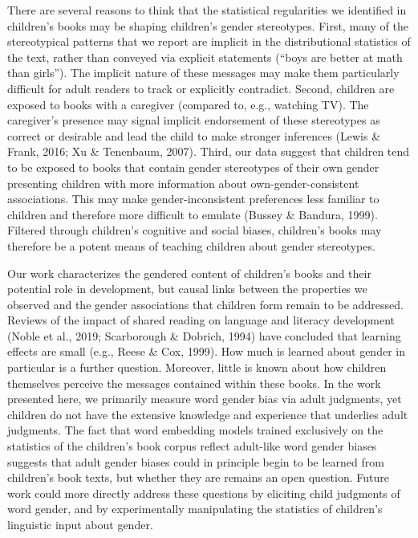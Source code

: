 \documentclass[
  english,
  ,man,floatsintext]{apa6}
\begin{document}
There are several reasons to think that the statistical regularities we identified in children's books may be shaping children's gender stereotypes. First, many of the stereotypical patterns that we report are implicit in the distributional statistics of the text, rather than conveyed via explicit statements (\enquote{boys are better at math than girls}). The implicit nature of these messages may make them particularly difficult for adult readers to track or explicitly contradict. Second, children are exposed to books with a caregiver (compared to, e.g., watching TV). The caregiver's presence may signal implicit endorsement of these stereotypes as correct or desirable and lead the child to make stronger inferences (Lewis \& Frank, 2016; Xu \& Tenenbaum, 2007). Third, our data suggest that children tend to be exposed to books that contain gender stereotypes of their own gender presenting children with more information about own-gender-consistent associations. This may make gender-inconsistent preferences less familiar to children and therefore more difficult to emulate (Bussey \& Bandura, 1999). Filtered through children's cognitive and social biases, children's books may therefore be a potent means of teaching children about gender stereotypes.

Our work characterizes the gendered content of children's books and their potential role in development, but causal links between the properties we observed and the gender associations that children form remain to be addressed. Reviews of the impact of shared reading on language and literacy development (Noble et al., 2019; Scarborough \& Dobrich, 1994) have concluded that learning effects are small (e.g., Reese \& Cox, 1999). How much is learned about gender in particular is a further question. Moreover, little is known about how children themselves perceive the messages contained within these books. In the work presented here, we primarily measure word gender bias via adult judgments, yet children do not have the extensive knowledge and experience that underlies adult judgments. The fact that word embedding models trained exclusively on the statistics of the children's book corpus reflect adult-like word gender biases suggests that adult gender biases could in principle begin to be learned from children's book texts, but whether they are remains an open question. Future work could more directly address these questions by eliciting child judgments of word gender, and by experimentally manipulating the statistics of children's linguistic input about gender.
\end{document}
